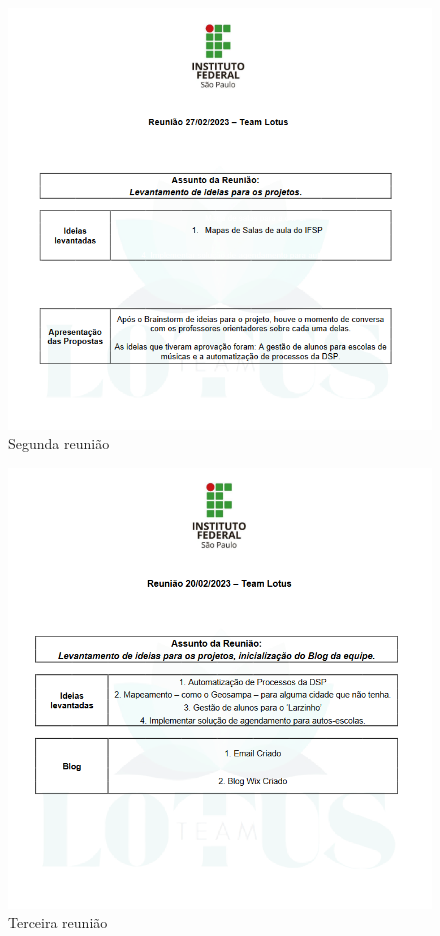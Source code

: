 \documentclass[12pt,a4paper]{article}
\begin{document}
\begin{figure}[H]
    \centering
     \includegraphics[width=15cm]{ilus2.png}
     \caption{Segunda reunião}
     \label{fig08}
\end{figure}

\begin{figure}[H]
    \centering
     \includegraphics[width=15cm]{ilus1.png}
     \caption{Terceira reunião}
     \label{fig09}
\end{figure}
\end{document}
